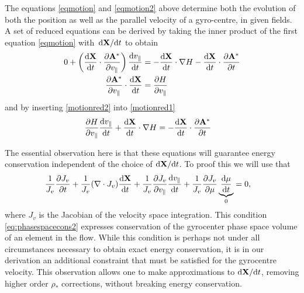 The equations \eqref{eqmotion} and \eqref{eqmotion2} above determine both the evolution of both the position as well as the parallel velocity of a gyro-centre, in given fields. 
A set of reduced equations can be derived by taking the inner product of the first equation \eqref{eqmotion} with $\,{{\rm d} {\bf X} / {\rm d} t}$ to 
obtain 
\begin{align}
0 + \left (\frac{\mathrm{d} \bf X}{\mathrm{d} t} \cdot  \frac{\partial {\bf A}^*}{\partial v_\parallel} \right ) \frac{\mathrm{d} v_\parallel}{\mathrm{d} t} 
&= -  \frac{\mathrm{d} \bf X}{\mathrm{d} t} \cdot \nabla H -  \frac{\mathrm{d} \bf X}{\mathrm{d} t} \cdot \frac{\partial {\bf A}^*}{\partial t} 
\label{motionred1}
\\
 \frac{\partial {\bf A}^*}{\partial v_\parallel} \cdot \frac{\mathrm{d} \bf X}{\mathrm{d} t} 
&= \frac{\partial H}{\partial v_\parallel} 
\label{motionred2} 
\end{align}
and by inserting \eqref{motionred2} into \eqref{motionred1} 
\begin{align}
\frac{\partial H}{\partial v_\parallel} \frac{\mathrm{d} v_\parallel}{\mathrm{d} t} 
+  \frac{\mathrm{d} \bf X}{\mathrm{d} t} \cdot \nabla H 
&= 
 -  \frac{\mathrm{d} \bf X}{\mathrm{d} t} \cdot \frac{\partial {\bf A}^*}{\partial t} 
\label{motionred3}
\end{align}


The essential observation here is that these equations will guarantee
energy conservation independent of the choice of
${{\rm d} {\bf X} / {\rm d} t}$. To proof this we will use that
\begin{align}
\frac{1 }{ J_v} \frac{\partial J_v}{\partial  t} + \frac{1 }{ J_v} (\nabla \cdot  J_v) \frac{\mathrm{d} \bf X}{\mathrm{d} t} 
 + \frac{1 }{ J_v}\frac{\partial J_v}{\partial  v_\parallel}  \frac{\mathrm{d} v_\parallel}{\mathrm{d}  t} 
 + \frac{1 }{ J_v}\frac{\partial J_v}{\partial  \mu}  \underbrace{\frac{\mathrm{d} \mu}{\mathrm{d} t}}_0
&= 0,
\label{eq:phasespacecons2}
\end{align}
where $J_v$ is the Jacobian of the velocity space integration. 
This condition \eqref{eq:phasespacecons2} expresses conservation of the gyrocenter phase space volume of an element in the flow.
While this condition is perhaps not under all circumstances necessary to obtain
exact energy conservation, it is in our derivation an additional constraint 
that must be satisfied for the gyrocentre velocity.  
This observation allows one to make approximations to ${{\rm d}{\bf X}/ {\rm d}t}$, removing higher order $\rho_*$ corrections, without 
breaking energy conservation. 

